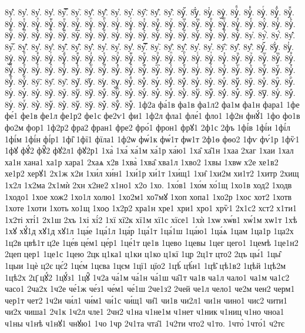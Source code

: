 {8у҅̑.
8у҅̓.
8у҅̔.
8у҅̾.
8у҅̿.
8у҅͘.
8у҅҃.
8у҅҄.
8у҅҅.
8у҅҆.
8у҅҇.
8у҅᷀.
8у҅᷁.
8у҅᷶.
8у᷷҅.
8у᷸҅.
8у᷹҅.
8у҅ⷠ.
8у҅ⷡ.
8у҅ⷢ.
8у҅ⷣ.
8у҅ⷤ.
8у҅ⷥ.
8у҅ⷦ.
8у҅ⷧ.
8у҅ⷨ.
8у҅ⷩ.
8у҅ⷪ.
8у҅ⷫ.
8у҅ⷬ.
8у҅ⷭ.
8у҅ⷮ.
8у҅ⷯ.
8у҅ⷰ.
8у҅ⷱ.
8у҅ⷲ.
8у҅ⷳ.
8у҅ⷴ.
8у҅ⷵ.
8у҅ⷶ.
8у҅ⷷ.
8у҅ⷸ.
8у҅ⷹ.
8у҅ⷺ.
8у҅ⷻ.
8у҅ⷼ.
8у҅ⷽ.
8у҅ⷾ.
8у҅ⷿ.
8у҅꙯.
8у҅ꙴ.
8у҅ꙵ.
8у҅ꙶ.
8у҅ꙷ.
8у҅ꙸ.
8у҅ꙹ.
8у҅ꙺ.
8у҅ꙻ.
8у҅꙼.
8у҅꙽.
8у҅ꚞ.
8у҅ꚟ.
8у҆.
8у҆̀.
8у҆́.
8у҆̂.
8у҆̅.
8у҆̆.
8у҆̇.
8у҆̈.
8у҆̋.
8у҆̏.
8у҆̑.
8у҆̓.
8у҆̔.
8у҆̾.
8у҆̿.
8у҆͘.
8у҆҃.
8у҆҄.
8у҆҅.
8у҆҆.
8у҆҇.
8у҆᷀.
8у҆᷁.
8у҆᷶.
8у᷷҆.
8у᷸҆.
8у᷹҆.
8у҆ⷠ.
8у҆ⷡ.
8у҆ⷢ.
8у҆ⷣ.
8у҆ⷤ.
8у҆ⷥ.
8у҆ⷦ.
8у҆ⷧ.
8у҆ⷨ.
8у҆ⷩ.
8у҆ⷪ.
8у҆ⷫ.
8у҆ⷬ.
8у҆ⷭ.
8у҆ⷮ.
8у҆ⷯ.
8у҆ⷰ.
8у҆ⷱ.
8у҆ⷲ.
8у҆ⷳ.
8у҆ⷴ.
8у҆ⷵ.
8у҆ⷶ.
8у҆ⷷ.
8у҆ⷸ.
8у҆ⷹ.
8у҆ⷺ.
8у҆ⷻ.
8у҆ⷼ.
8у҆ⷽ.
8у҆ⷾ.
8у҆ⷿ.
8у҆꙯.
8у҆ꙴ.
8у҆ꙵ.
8у҆ꙶ.
8у҆ꙷ.
8у҆ꙸ.
8у҆ꙹ.
8у҆ꙺ.
8у҆ꙻ.
8у҆꙼.
8у҆꙽.
8у҆ꚞ.
8у҆ꚟ.
8у҇.
8у᷀.
8у᷁.
8у᷶.
8у᷷.
8у᷸.
8у᷹.
8уⷠ.
8уⷡ.
8уⷢ.
8уⷣ.
8уⷤ.
8уⷥ.
8уⷦ.
8уⷧ.
8уⷨ.
8уⷩ.
8уⷪ.
8уⷫ.
8уⷬ.
8уⷭ.
8уⷮ.
8уⷯ.
8уⷰ.
8уⷱ.
8уⷲ.
8уⷳ.
8уⷴ.
8уⷵ.
8уⷶ.
8уⷷ.
8уⷸ.
8уⷹ.
8уⷺ.
8уⷻ.
8уⷼ.
8уⷽ.
8уⷾ.
8уⷿ.
8у꙯.
8уꙴ.
8уꙵ.
8уꙶ.
8уꙷ.
8уꙸ.
8уꙹ.
8уꙺ.
8уꙻ.
8у꙼.
8у꙽.
8уꚞ.
8уꚟ.
1ф2а
фа́1в
фа1в
фа1л2
фа1м
фа1н
фара1
1фе
фе́1
фе1в
фе1л
фе1р2
фе1с
фе2ѵ1
фи1
1ф2л
фла1
фле́1
фло1
1ф2н
фнꙋ́1
1фо
фо1в
фо2м
фор1
1ф2р2
фра2
фран1
фре2
фро́1
фрон1
фрꙋ1
2ф1с
2фъ
1фі́в
1фі́и
1фі́л
1фі́м
1фі́н
фі́р1
1фі̑
1фї1
фїла1
1ф2ѡ
фѡ́1к
фѡ́1т
фѡ1т
2ф1ѳ
фѳо2
1фѵ
фѵ́1р
1фѷ1
1фꙋ
фꙋ́2
фꙋ̑2
фꙋ2л1
фꙋ2р1
1ха̀
1ха́
ха́1м
ха́1р
ха́ю1
1ха̑
ха̑1н
1хаа
2хаг
1хаи
1хал
ха1н
хана1
ха1р
хара1
2хаѧ
х2в
1хва̀
1хва̑
хва1л
1хво2
1хвы
1хвѡ
х2е
хе1в2
хе1р2
херꙋ1
2х1ж
х2и
1хи́л
хи́н1
1хи́1р
хи́1т
1хи́щ1
1хи̑
1хи2м
хи1т2
1хитр
2хищ
1х2л
1х2ма
2х1мѝ
2хн
х2не2
х1но1
х2о
1хо.
1хо́в1
1хо́м
хо́1щ
1хо1в
ход2
1ходв
1ходо1
1хое
хож2
1хо1л
холю1
1хо2м1
хо7мꙋ
1хоп
хопа1
1хо2р
1хос
хот2
1хотв
1хоте
1хоти
1хоть
хо1щ
1хоѻ
1х2р2
хра1н
хре1
хри1
хро1
хрѷ1
2х1с2
хст2
х1ти1
1х2ті
хті́1
2х1ш
2хъ
1хі
хі́2
1хї
хї2к
хї1м
хї1с
хїсе1
1хѝ
1хѡ
хѡ́в1
хѡ́1м
хѡ1т
1хѣ
1хꙋ
хꙋ́1д
хꙋ1д
хꙋ1л
1ца́е
1ца́1л
1ца́р
1ца́1т
1ца́1ш
1ца́ю1
1ца́ѧ
1цам
1ца1р
1ца2х
1ц2в
цвѣ1т
ц2е
1це́в
це́м1
це́р1
1це́1т
це1в
1цево
1цевы
1цег
цего1
1цемѣ
1це1н2
2цеп
цер1
1це1с
1цею
2цк
ц1ка1
ц1ки
ц1ко
ц1кї
1цр
2ц1т
цто2
2цъ
цы́1
1цы̑
1цыи
1цѐ
ц2є
цє́2
1цє́м
1цєва
1цєм
1цї1
цїо2
1цѣ́
цѣ́н1
1цѣ̑
цѣ1в2
1цѣй
1цѣ2м
1цѣ2х
2ц҃
цꙋ́2
1цꙋ́з1
1цꙋ̑
1ч2а
ча́1м
ча́1н
ча́1ш
ча̑1т
ча1в
ча1л
чало1
ча1м
ча1с2
часо1
2ча2х
1ч2е
че́1ж
че́з1
че́м1
че́1ш
2че1з2
2чей
че1л
чело1
че2м
чен2
черм1
чер1т
чет2
1ч2и
чи́л1
чи́м1
чи́1с
чи́щ1
чи̑1
чи1в
чи2л1
чи1н
чино1
чис2
чити1
чи2х
чиша1
2ч1к
1ч2л
чле1
2чн2
ч1на
ч1не1м
ч1нет
ч1ник
ч1ниц
ч1но
чноа1
ч1ны
ч1нѣ
ч1нꙋ1
чнꙋю1
1чо
1чр
2ч1та
чта̑1
1ч2ти
что2
ч1то.
1что̀
1что́1
ч2тє
}
